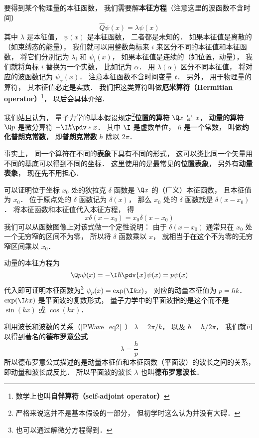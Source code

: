 要得到某个物理量的本征函数， 我们需要解\textbf{本征方程}（注意这里的波函数不含时间）
\begin{equation}
\hat Q \psi(x) = \lambda \psi(x)
\end{equation}
其中 $\lambda$ 是本征值， $\psi(x)$ 是本征函数， 二者都是未知的． 如果本征值是离散的（如束缚态的能量）， 我们就可以用整数角标来 $i$ 来区分不同的本征值和本征函数， 将它们分别记为 $\lambda_i$ 和 $\psi_i(x)$， 如果本征值是连续的（如位置，动量）， 我们就将角标 $i$ 替换为一个实数， 比如记为 $\alpha$． 用 $\lambda(\alpha)$ 区分不同本征值， 将对应的波函数记为 $\psi_\alpha(x)$． 注意本征函数不含时间变量 $t$． 另外， 用于物理量的算符， 其本征值必定是实数． 我们把这类算符叫做\textbf{厄米算符（Hermitian operator）}\footnote{数学上也叫\textbf{自伴算符（self-adjoint operator）}}， 以后会具体介绍．

我们姑且认为， 量子力学的基本假设规定\footnote{严格来说这并不是基本假设的一部分， 但初学时这么认为并没有大碍．}\textbf{位置的算符} $\Q x$ 是 $x$， \textbf{动量的算符} $\Q p$ 是微分算符 $-\I\hbar \pdv*{x}$． 其中 $\I$ 是虚数单位， $\hbar$ 是一个常数， 叫做\textbf{约化普朗克常数}， 即\textbf{普朗克常数} $h$ 除以 $2\pi$．

事实上， 同一个算符在不同的\textbf{表象}下具有不同的形式， 这可以类比同一个矢量用不同的基底可以得到不同的坐标． 这里使用的是最常见的\textbf{位置表象}， 另外有\textbf{动量表象}， 现在先不用担心．

可以证明位于坐标 $x_0$ 处的狄拉克 $\delta$ 函数是 $\Q x$ 的（广义）本征函数， 且本征值为 $x_0$． 位于原点处的 $\delta$ 函数记为 $\delta(x)$， 那么 $x_0$ 处的 $\delta$ 函数就是 $\delta (x - x_0)$． 将本征函数和本征值代入本征方程， 得
\begin{equation}
x \delta(x - x_0) = x_0 \delta(x - x_0)
\end{equation}
我们可以从函数图像上对该式做一个定性说明： 由于 $\delta(x - x_0)$ 通常只在 $x_0$ 处一个无穷窄的区间不为零， 所以将 $\delta$ 函数乘以 $x$， 就相当于在这个不为零的无穷窄区间乘以 $x_0$．

动量的本征方程为
\begin{equation}
\Q p \psi(x) = -\I\hbar \pdv{x} \psi(x) = p \psi(x)
\end{equation}
代入即可证明本征函数为\footnote{也可以通过解微分方程得到．} $\psi_p(x) = \exp(\I k x)$， 对应的动量本征值为 $p = \hbar k$． $\exp(\I k x)$ 是平面波的复数形式， 量子力学中的平面波指的是这个而不是 $\sin(kx)$ 或 $\cos(kx)$．

利用波长和波数的关系（\autoref{PWave_eq2}~）
$\lambda = 2\pi/k$， 以及 $\hbar = h/2\pi$， 我们就可以得到著名的\textbf{德布罗意公式}
\begin{equation}
\lambda = \frac{h}{p}
\end{equation}
所以德布罗意公式描述的是动量本征值和本征函数（平面波）的波长之间的关系， 即动量和波长成反比． 所以平面波的波长 $\lambda$ 也叫\textbf{德布罗意波长}．

